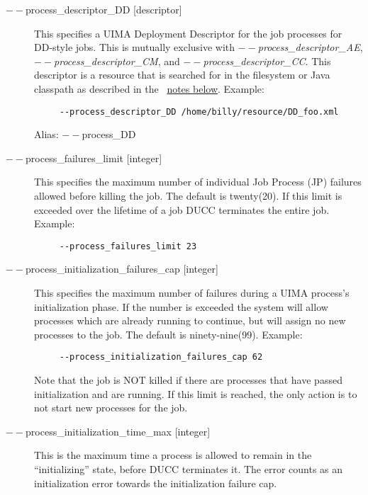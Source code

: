 \begin{description}
           \item[$--$process\_descriptor\_DD {[descriptor]}  ]
             This specifies a UIMA Deployment Descriptor for the job processes for DD-style jobs. 
             This is mutually exclusive with {\em $--$process\_descriptor\_AE}, {\em $--$process\_descriptor\_CM}, 
             and {\em $--$process\_descriptor\_CC}. This 
             descriptor is a resource that is searched for in the filesystem or Java classpath as described 
             in the ~\hyperref[par:cli.submit.notes]{notes below}.
             Example:
             \begin{verbatim}
     --process_descriptor_DD /home/billy/resource/DD_foo.xml
             \end{verbatim}
             Alias: $--$process\_DD

           \item[$--$process\_failures\_limit {[integer]} ]
             This specifies the maximum number of individual Job Process (JP) failures allowed
             before killing the job. The default is twenty(20). If this limit is exceeded over the lifetime 
             of a job DUCC terminates the entire job. 
             Example:
             \begin{verbatim}
     --process_failures_limit 23
             \end{verbatim}
                          
           \item[$--$process\_initialization\_failures\_cap {[integer]} ] This specifies the maximum
             number of failures during a UIMA process's initialization phase.  If the number is
             exceeded the system will allow processes which are already running to continue, but
             will assign no new processes to the job.  The default is ninety-nine(99). Example:
             \begin{verbatim}
     --process_initialization_failures_cap 62
             \end{verbatim}
             Note that the job is NOT killed if there are processes that have passed initialization and are 
             running. If this limit is reached, the only action is to not start new processes for the job. 

           \item[$--$process\_initialization\_time\_max {[integer]}] This is the maximum time a process
             is allowed to remain in the ``initializing'' state, before DUCC terminates it.  The error
             counts as an initialization error towards the initialization failure cap.


\end{description}
